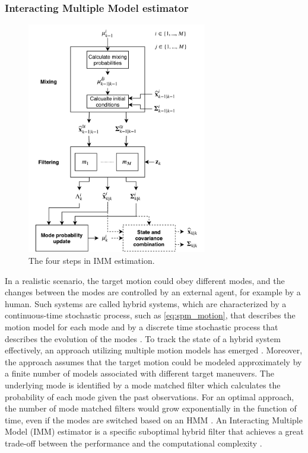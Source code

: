 \documentclass[english, 12pt, a4paper, elec, utf8, a-1b, online]{aaltothesis}
\begin{document}
\subsubsection{Interacting Multiple Model estimator}
\label{sec:IMM}

\begin{figure}[b]
    \centering
    \includegraphics[width=0.7\textwidth]{figures/IMM_figure.pdf}
    \caption{
    The four steps in IMM estimation.}
    \label{fig:IMM}
\end{figure}

In a realistic scenario, the target motion could obey different modes, and the changes between the modes are controlled by an external agent, for example by a human.
Such systems are called hybrid systems, which are characterized by a continuous-time stochastic process, such as \eqref{eq:spm_motion}, that describes the motion model for each mode and by a discrete time stochastic process that describes the evolution of the modes \cite{Mazor1998}.
To track the state of a hybrid system effectively, an approach utilizing multiple motion models has emerged \cite{BarShalom2001}.
Moreover, the approach assumes that the target motion could be modeled approximately by a finite number of models associated with different target maneuvers.
The underlying mode is identified by a mode matched filter which calculates the probability of each mode given the past observations.
For an optimal approach, the number of mode matched filters would grow exponentially in the function of time, even if the modes are switched based on an HMM \cite{BarShalom2001}.
An Interacting Multiple Model (IMM) estimator is a specific suboptimal hybrid filter that achieves a great trade-off between the performance and the computational complexity \cite{Mazor1998}.
\end{document}
